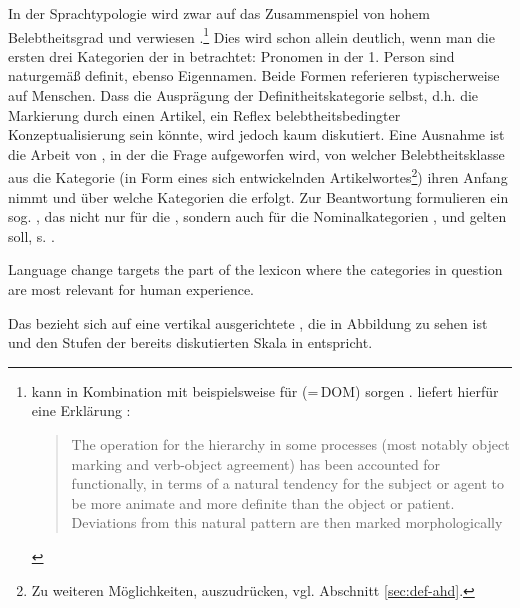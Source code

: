 In der Sprachtypologie wird zwar auf das Zusammenspiel von hohem Belebtheitsgrad  und  verwiesen \parencites()()[s. z.B.][53]{Dahl1996}[][166--167]{Croft2006}.\footnote{ kann in Kombination mit  beispielsweise für  (=\,DOM) sorgen \parencite{Aissen2003}. \textcite{Lyons1999} liefert hierfür eine Erklärung \parencite[ähnlich argumentiert auch][119]{Croft1995}: \blockcquote[2014]{Lyons1999}{The operation for the hierarchy in some processes (most notably object marking and verb-object agreement) has been accounted for functionally, in terms of a natural tendency for the subject or agent to be more animate and more definite than the object or patient. Deviations from this natural pattern are then marked morphologically}.}
Dies wird schon allein deutlich,  wenn man die ersten drei Kategorien der  in  betrachtet:  Pronomen in der 1. Person sind naturgemäß definit, ebenso  Eigennamen. Beide Formen referieren typischerweise auf Menschen. Dass die Ausprägung der Definitheitskategorie  selbst, d.h. die  Markierung durch einen Artikel, ein Reflex belebtheitsbedingter  Konzeptualisierung sein könnte, wird jedoch kaum diskutiert. Eine Ausnahme ist die Arbeit von \textcite{Enger2011}, in der die Frage aufgeworfen wird, von welcher Belebtheitsklasse  aus die Kategorie  (in Form eines sich entwickelnden Artikelwortes\footnote{Zu weiteren Möglichkeiten,  auszudrücken, vgl. Abschnitt \ref{sec:def-ahd}.}) ihren Anfang nimmt und über welche Kategorien die  erfolgt. Zur Beantwortung formulieren \textcite[206]{Enger2011} ein sog. , das nicht nur für die , sondern auch für die Nominalkategorien ,   und  gelten soll, s. . 
\begin{exe}
	\ex \label{ex:enger} Language change targets the part of the lexicon where the categories in question are most relevant for human experience.
	\end{exe}
\noindent
Das  bezieht sich auf eine vertikal ausgerichtete , die in Abbildung  zu sehen ist und den Stufen der bereits diskutierten Skala in   entspricht. 

